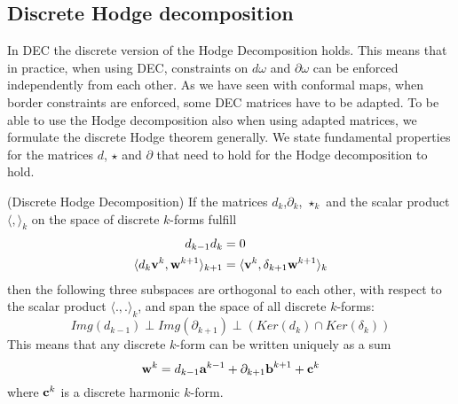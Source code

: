 \subsection{Discrete Hodge decomposition}
In DEC the discrete version of the Hodge Decomposition holds. This  means that in practice, when using DEC, constraints on $d\omega$ and $\partial \omega$ can be enforced independently from each other. As we have seen with conformal maps, when border constraints are enforced, some DEC matrices have to be adapted. To be able to use the Hodge decomposition also when using adapted matrices, we formulate the discrete Hodge theorem generally. We state fundamental properties for the matrices $d$, $\star$ and $\partial$ that need to hold for the Hodge decomposition to hold.

\begin{thm}(Discrete Hodge Decomposition) If the matrices $d_k$,$\partial_k$, $\star_k$ and the scalar product $\langle , \rangle_k$ on the space of discrete $k$-forms fulfill
\begin{align}
d_{k-1} d_{k} &= 0 \\
\langle  d_k\textbf{v}^k,\textbf{w}^{k+1} \rangle_{k+1} &= \langle  \textbf{v}^k,\delta_{k+1}\textbf{w}^{k+1} \rangle_k \label{eq:adjoint}
\end{align}
then the following three subspaces are orthogonal to each other, with respect to the scalar product $\langle.,.\rangle_k$, and span the space of all discrete $k$-forms:
\[Img(d_{k-1}) \perp Img (\partial_{k+1}) \perp \left(Ker(d_k) \cap Ker(\delta_k)\right)\]
This means that any discrete $k$-form can be written uniquely as a sum
\[\textbf{w}^k = d_{k-1} \textbf{a}^{k-1} + \partial_{k+1} \textbf{b}^{k+1} + \textbf{c}^k\]
where $\textbf{c}^k$ is a discrete harmonic $k$-form.
\end{thm}

